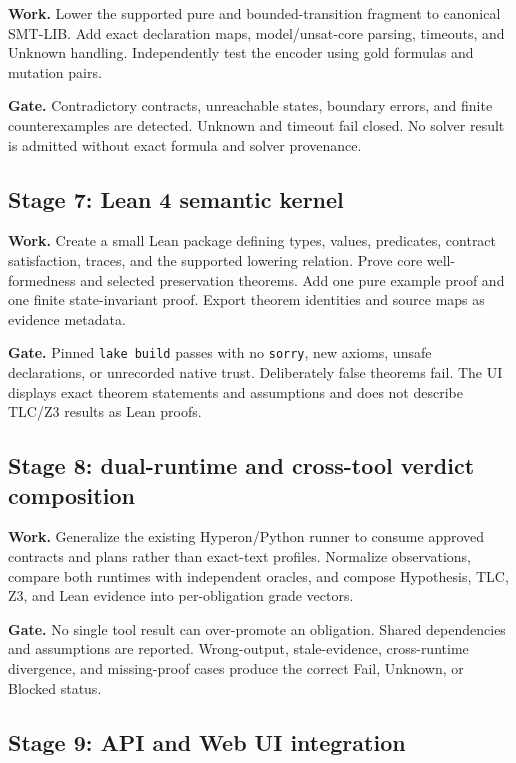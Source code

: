 \documentclass[10pt]{article}
\begin{document}
\textbf{Work.} Lower the supported pure and bounded-transition fragment to
canonical SMT-LIB.  Add exact declaration maps, model/unsat-core parsing,
timeouts, and Unknown handling.  Independently test the encoder using gold
formulas and mutation pairs.

\textbf{Gate.} Contradictory contracts, unreachable states, boundary errors,
and finite counterexamples are detected.  Unknown and timeout fail closed.
No solver result is admitted without exact formula and solver provenance.

\subsection*{Stage 7: Lean 4 semantic kernel}

\textbf{Work.} Create a small Lean package defining types, values, predicates,
contract satisfaction, traces, and the supported lowering relation.  Prove
core well-formedness and selected preservation theorems.  Add one pure example
proof and one finite state-invariant proof.  Export theorem identities and
source maps as evidence metadata.

\textbf{Gate.} Pinned \texttt{lake build} passes with no \texttt{sorry}, new
axioms, unsafe declarations, or unrecorded native trust.  Deliberately false
theorems fail.  The UI displays exact theorem statements and assumptions and
does not describe TLC/Z3 results as Lean proofs.

\subsection*{Stage 8: dual-runtime and cross-tool verdict composition}

\textbf{Work.} Generalize the existing Hyperon/Python runner to consume
approved contracts and plans rather than exact-text profiles.  Normalize
observations, compare both runtimes with independent oracles, and compose
Hypothesis, TLC, Z3, and Lean evidence into per-obligation grade vectors.

\textbf{Gate.} No single tool result can over-promote an obligation.  Shared
dependencies and assumptions are reported.  Wrong-output, stale-evidence,
cross-runtime divergence, and missing-proof cases produce the correct Fail,
Unknown, or Blocked status.

\subsection*{Stage 9: API and Web UI integration}
\end{document}
